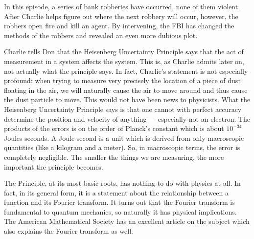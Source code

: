 \newpage
{}
{}
\setcounter{activity}{0}

In this episode, a series of bank robberies have occurred, none of them violent. After Charlie helps figure out where the next robbery will occur, however, the robbers open fire and kill an agent. By intervening, the FBI has changed the methods of the robbers and revealed an even more dubious plot.



Charlie tells Don that the Heisenberg Uncertainty Principle says that the act of measurement in a system affects the system. This is, as Charlie admits later on, not actually what the principle says. In fact, Charlie's statement is not especially profound: when trying to measure very precisely the location of a piece of dust floating in the air, we will naturally cause the air to move around and thus cause the dust particle to move. This would not have been news to physicists. What the Heisenberg Uncertainty Principle says is that one cannot with perfect accuracy determine the position and velocity of anything --- especially not an electron. The products of the errors is on the order of Planck's constant which is about $10^{-34}$ Joules-seconds. A Joule-second is a unit which is derived from only macroscopic quantities (like a kilogram and a meter). So, in macroscopic terms, the error is completely negligible. The smaller the things we are measuring, the more important the principle becomes. 


The Principle, at its most basic roots, has nothing to do with physics at all. In fact, in its general form, it is a statement about the relationship between a function and its Fourier transform. It turns out that the Fourier transform is fundamental to quantum mechanics, so naturally it has physical implications. The American Mathematical Society has an excellent article on the subject which also explains the Fourier transform as well. 




